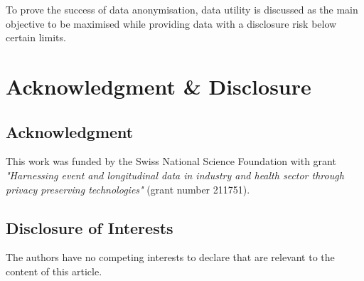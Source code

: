 \documentclass{article}
\begin{document}
To prove the success of data anonymisation, data utility is discussed as the main objective to be maximised while providing data with a disclosure risk below certain limits.


\section*{Acknowledgment \& Disclosure} 
\subsection*{Acknowledgment} 
This work was funded by the Swiss National Science Foundation with grant \textit{"Harnessing event and longitudinal data in industry and health sector through privacy preserving technologies"} (grant number 211751).

\subsection*{Disclosure of Interests} 
The authors have no competing interests to declare that are relevant to the content of this article. 



\end{document}
